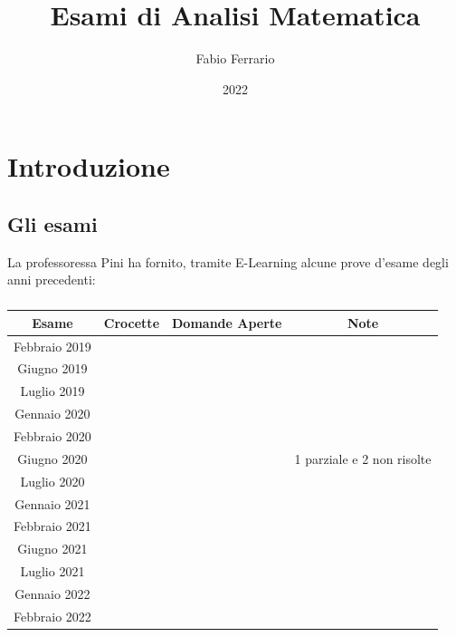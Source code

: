 \documentclass[12pt, a4paper, openany]{book}
\begin{document}
\title{Esami di Analisi Matematica}
\author{Fabio Ferrario}
\date{2022}
\maketitle
\tableofcontents

\chapter{Introduzione}
\section{Gli esami}
La professoressa Pini ha fornito, tramite E-Learning alcune prove d'esame degli anni precedenti:
\paragraph*{}
\begin{tabular}{ |c|c|c|c| }
	\hline
	Esame         & Crocette   & Domande Aperte & Note                       \\
	\hline
	Febbraio 2019 &            &                &                            \\
	Giugno 2019   & \checkmark &                &                            \\
	Luglio 2019   &            &                &                            \\
	Gennaio 2020  &            &                &                            \\
	Febbraio 2020 & \checkmark &                &                            \\
	Giugno 2020   & \checkmark &                & 1 parziale e 2 non risolte \\
	Luglio 2020   &            &                &                            \\
	Gennaio 2021  &            &                &                            \\
	Febbraio 2021 &            &                &                            \\
	Giugno 2021   & \checkmark &                &                            \\
	Luglio  2021  &            &                &                            \\
	Gennaio 2022  &            &                &                            \\
	Febbraio 2022 &            &                &                            \\
	\hline
\end{tabular}
\end{document}
